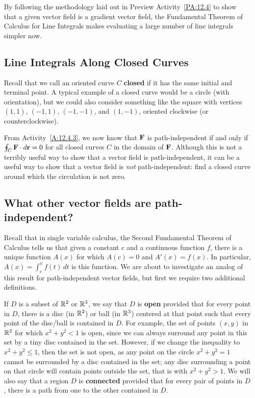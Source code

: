 

By following the methodology laid out in Preview
Activity~\ref{PA:12.4} to show that a given vector field is a gradient
vector field, the Fundamental Theorem of Calculus for Line Integrals
makes evaluating a large number of line integrals simpler now.




\subsection*{Line Integrals Along Closed Curves}

Recall that we call an oriented curve $C$ \textbf{closed} if it has
the same initial and terminal point. A typical example of a closed
curve would be a circle (with orientation), but we could also consider
something like the square with vertices $(1,1)$, $(-1,1)$, $(-1,-1)$,
and $(1,-1)$, oriented clockwise (or counterclockwise).



From Activity~\ref{A:12.4.3}, we now know that $\mathbf{F}$ is path-independent if and only if $\oint_C\mathbf{F}\cdot d\mathbf{r} = 0$ for all closed
curves $C$ in the domain of $\mathbf{F}$. Although this is not a terribly
useful way to show that a vector field is path-independent, it can be
a useful way to show that a vector field is \emph{not}
path-independent: find a closed curve around which the circulation is
not zero.



\subsection*{What other vector fields are path-independent?}

Recall that in single variable calculus, the Second Fundamental
Theorem of Calculus tells us that given a constant $c$ and a
continuous function $f$, there is a unique function $A(x)$ for which
$A(c) = 0$ and $A'(x) = f(x)$. In particular, $A(x) = \int_c^x f(t)\,
dt$ is this function. We are about to investigate an analog of this result for
path-independent vector fields, but first we require two additional
definitions.

If $D$ is a subset of $\mathbb{R}^2$ or $\mathbb{R}^3$, we say that $D$ is
\textbf{open} provided that for every point in $D$, there
is a disc (in $\mathbb{R}^2$) or ball (in $\mathbb{R}^3$) centered at that point such
that every point of the disc/ball is contained in $D$. For example,
the set of points $(x,y)$ in $\mathbb{R}^2$ for which $x^2+y^2 < 1$ is open,
since we can always surround any point in this set by a tiny disc
contained in the set. However, if we change the inequality to
$x^2+y^2\leq 1$, then the set is not open, as any point on the circle
$x^2+y^2=1$ cannot be surrounded by a disc contained in the set; any
disc surrounding a point on that circle will contain points outside
the set, that is with $x^2+y^2>1$. We will also say that a region $D$
is \textbf{connected} provided that for
every pair of points in $D$, there is a path from one to the other
contained in $D$.

